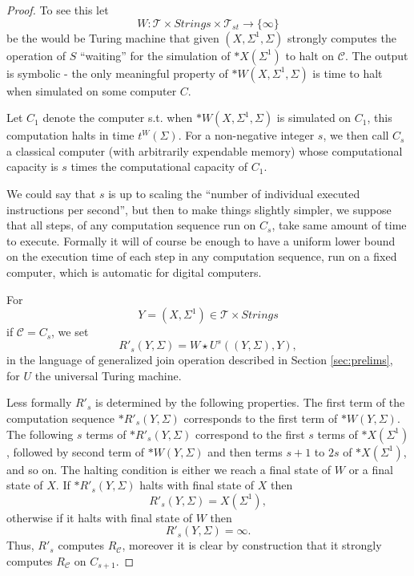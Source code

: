 \documentclass[9pt,twocolumn,twoside,lineno]{pnas-new}
\numberwithin{equation}{section}
\theoremstyle{definition}
\theoremstyle{remark}
\begin{document}
   \begin{proof}
   To see this let $$W:  \mathcal{T} \times Strings \times \mathcal{T} _{st}      \to \{\infty \}$$  be the would be Turing machine that given $(X, \Sigma ^{1}, \Sigma)$ strongly computes the operation of $S$ ``waiting'' for the simulation of $*X  (\Sigma ^{1} ) $ to halt on $\mathcal{C}$. The output is symbolic - the only meaningful property of $*W (X,\Sigma ^{1}, \Sigma)$ is time to halt when simulated on some computer $C$. 
      
      Let $C _{1} $ denote the computer s.t. when 
$*W (X,\Sigma ^{1}, \Sigma)$ is simulated on $C _{1} $, this computation halts in time $t ^{W} (\Sigma) $. For a non-negative integer $s$, we then call $C _{s} $ a classical computer (with arbitrarily expendable memory) whose computational capacity is  $s$ times the computational capacity of $C _{1} $. 

We could say that $s$ is up to scaling the ``number of individual executed instructions per second'', but then to make things slightly simpler, we suppose that all steps, of any computation sequence run on $C _{s} $, take same amount of time to execute. Formally it will of course be enough to have a uniform lower bound on the execution time of each step in any computation sequence, run on a fixed computer, which is automatic for digital computers.


 For $$Y = (X, \Sigma ^{1} ) \in \mathcal{T} \times Strings$$ if $\mathcal{C}=C _{s}$, we set 
\begin{equation*}
   R' _{s} (Y, \Sigma) =   W \star U ^{s} ((Y, \Sigma), Y), 
\end{equation*}
in the language of generalized join operation described in Section \ref{sec:prelims}, 
for $U$ the universal Turing machine. 

Less formally $R'  _{s} $ is determined by the following properties.   
The first term of the computation sequence $* R'  _{s} (Y, \Sigma) $ corresponds to the first term of  $* W     (Y, \Sigma)$. The following $s$ 
terms of $* R'   _{s} (Y, \Sigma) $ correspond to the first $s$ terms of $* X    (\Sigma ^{1})$, followed by second term of  $* W  (Y, \Sigma) $ and then terms $s+1$ to $2s$ of $* X  (\Sigma ^{1})$, and so on.
The halting condition is either we reach a final state of $W$ or a final state of $X $. If $* R'  _{s} (Y, \Sigma) $ halts with final state of $X$ then $$R'   _{s} (Y, \Sigma) = X  (\Sigma ^{1} ), $$ otherwise if it halts with final state of $W $ then  $$ R'  _{ s} (Y, \Sigma)= \infty.$$
Thus, $R' _{s}$ computes $R _{ \mathcal{C}} $, moreover it is clear by construction that it strongly computes $R _{\mathcal{C}} $ on $C _{s+1} $.
   \end{proof}
\end{document}
